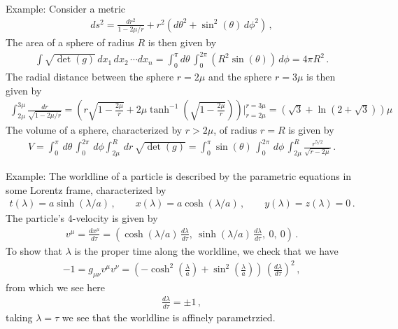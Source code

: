\documentclass[11pt, onesided]{book}
\theoremstyle{break}
\theoremstyle{break}
\newcommand{\example}{\color{green}Example: \color{black}}
\begin{document}
\example Consider a metric
\begin{align*}
ds^2 = \frac{dr^2}{1-2\mu/r} + r^2(d\theta^2 + \sin^2(\theta) \, d\phi^2)\,,
\end{align*}
The area of a sphere of radius $R$ is then given by
\begin{align*}
\int \sqrt{\det(g)}\, dx_1\,dx_2\,\cdots dx_n = \int_0^\pi d\theta \, \int_{0}^{2\pi}(R^2 \sin(\theta))\, d\phi = 4\pi R^2\,.
\end{align*}
The radial distance between the sphere $r = 2\mu$ and the sphere $r = 3\mu$ is then given by
\begin{align*}
\int_{2\mu}^{3\mu} \frac{dr}{\sqrt{1- 2\mu/r}} = \left( r\sqrt{1- \frac{2\mu}{r}} + 2\mu \tanh^{-1}\left( \sqrt{1- \frac{2\mu}{r}}\right) \right)|^{r=3\mu}_{r = 2\mu} = (\sqrt{3} + \ln(2+\sqrt{3})) \mu
\end{align*}
The volume of a sphere, characterized by $r > 2\mu$, of radius $r = R$ is given by
\begin{align*}
V = \int_0^\pi \,d\theta \, \int_0^{2\pi}\, d\phi \int_{2\mu}^R \, dr\, \sqrt{\det(g)} = \int_0^\pi \sin(\theta) \, \int_0^{2\pi}\,d\phi \,\int_{2\mu}^R \frac{r^{5/2}}{\sqrt{r- 2\mu}}\,.
\end{align*}

\example The worldline of a particle is described by the parametric equations in some Lorentz frame, characterized by
\begin{align*}
t(\lambda) = a\sinh(\lambda/a) \,,\qquad
x(\lambda) = a\cosh(\lambda/a)\,,\qquad
y(\lambda) = z(\lambda) = 0\,.
\end{align*}
The particle's 4-velocity is given by
\begin{align*}
v^\mu = \frac{dx^\mu}{d\tau} = \left( \cosh(\lambda/a) \, \frac{d\lambda}{d\tau},\ \sinh(\lambda/a)\,\frac{d\lambda}{d\tau},\ 0,\ 0\right)\,.
\end{align*}
To show that $\lambda$ is the proper time along the worldline, we check that we have
\begin{align*}
-1 = g_{\mu\nu}v^\mu v^\nu = \left(
-\cosh^2\left(\frac{\lambda}{a}\right) + \sin^2\left( \frac{\lambda}{a}\right)\right) \,\left( \frac{d\lambda}{d\tau}\right)^2\,,
\end{align*}
from which we see here
\begin{align*}
\frac{d\lambda}{d\tau} = \pm 1\,,
\end{align*}
taking $\lambda = \tau$ we see that the worldline is affinely parametrzied. \\
\end{document}
